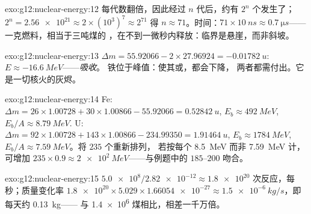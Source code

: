\begin{solution}{exo:g12:nuclear-energy:12}
每代数翻倍，因此经过 $n$ 代后，约有 $2^n$
个发生了；$2^{n} = \num{2.56e21} \approx 2 \times (10^{3})^{7}
\approx 2^{71}$ 得 $n \approx 71$。时间：$71 \times \qty{10}{ns}
\approx \qty{0.7}{\micro s}$——一克燃料，相当于三吨煤的
，在不到一微秒内释放：临界是悬崖，而非斜坡。
\end{solution}

\begin{solution}{exo:g12:nuclear-energy:13}
$\Delta m = 55.92066 - 2 \times 27.96924 = \qty{-0.01782}{u}$:
$E \approx \qty{-16.6}{MeV}$——\emph{吸收}。
铁位于峰值：使其或，都会下降，
两者都需付出。它是一切核火的灰烬。
\end{solution}

\begin{solution}{exo:g12:nuclear-energy:14}
Fe: $\Delta m = 26 \times 1.00728 + 30 \times 1.00866 - 55.92066 =
\qty{0.52842}{u}$, $E_b \approx \qty{492}{MeV}$, $E_b/A \approx
\qty{8.79}{MeV}$. U: $\Delta m = 92 \times 1.00728 + 143 \times
1.00866 - 234.99350 = \qty{1.91464}{u}$, $E_b \approx \qty{1784}{MeV}$,
$E_b/A \approx \qty{7.59}{MeV}$。将 $235$ 个重新排列，
若按每个 \qty{8.5}{MeV} 而非 \qty{7.59}{MeV} 计，可增加 $235 \times 0.9
\approx \qty{2e2}{MeV}$——与例题中的 $185$--$200$ 吻合。
\end{solution}

\begin{solution}{exo:g12:nuclear-energy:15}
$\num{5.0e8}/\num{2.82e-12} \approx \num{1.8e20}$ 次反应，每
秒；质量变化率 $\num{1.8e20} \times 5.029 \times \num{1.66054e-27}
\approx \qty{1.5e-6}{kg/s}$，即每天约 \qty{0.13}{kg}——
与 \num{1.4e6} 煤相比，相差一千万倍。
\end{solution}

